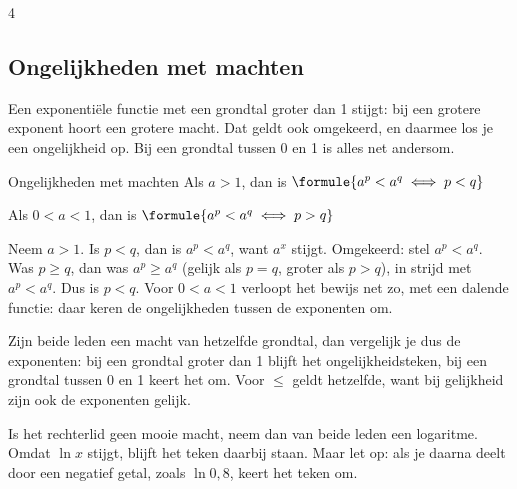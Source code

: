 \begin{alleenvoor}{4}
\subsection{Ongelijkheden met machten}

Een exponentiële functie met een grondtal groter dan 1 stijgt: bij een grotere exponent hoort een grotere macht. Dat geldt ook omgekeerd, en daarmee los je een ongelijkheid op. Bij een grondtal tussen 0 en 1 is alles net andersom.

\begin{theorie}
\begin{stelling}{Ongelijkheden met machten}
Als $a > 1$, dan is \qquad $\formule{a^p < a^q \iff p < q}$

Als $0 < a < 1$, dan is \qquad $\formule{a^p < a^q \iff p > q}$
\end{stelling}
\begin{bewijs}
Neem $a > 1$. Is $p < q$, dan is $a^p < a^q$, want $a^x$ stijgt. Omgekeerd: stel $a^p < a^q$. Was $p \geqslant q$, dan was $a^p \geqslant a^q$ (gelijk als $p = q$, groter als $p > q$), in strijd met $a^p < a^q$. Dus is $p < q$. Voor $0 < a < 1$ verloopt het bewijs net zo, met een dalende functie: daar keren de ongelijkheden tussen de exponenten om.
\end{bewijs}
\end{theorie}

Zijn beide leden een macht van hetzelfde grondtal, dan vergelijk je dus de exponenten: bij een grondtal groter dan 1 blijft het ongelijkheidsteken, bij een grondtal tussen 0 en 1 keert het om. Voor $\leqslant$ geldt hetzelfde, want bij gelijkheid zijn ook de exponenten gelijk.


\begin{oefeningen}
\end{oefeningen}

Is het rechterlid geen mooie macht, neem dan van beide leden een logaritme. Omdat $\ln x$ stijgt, blijft het teken daarbij staan. Maar let op: als je daarna deelt door een negatief getal, zoals $\ln 0{,}8$, keert het teken om.


\end{alleenvoor}

